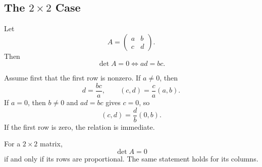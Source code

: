 \subsection{The $2\times2$ Case}

Let
\[
A=\begin{pmatrix}a&b\\c&d\end{pmatrix}.
\]
Then
\[
\det A=0\iff ad=bc.
\]

\begin{proofbox}
Assume first that the first row is nonzero. If $a\neq0$, then
\[
d=\frac{bc}{a},
\qquad
(c,d)=\frac ca(a,b).
\]
If $a=0$, then $b\neq0$ and $ad=bc$ gives $c=0$, so
\[
(c,d)=\frac db(0,b).
\]
If the first row is zero, the relation is immediate.
\end{proofbox}

\begin{theorembox}
For a $2\times2$ matrix,
\[
\det A=0
\]
if and only if its rows are proportional. The same statement holds for its columns.
\end{theorembox}
